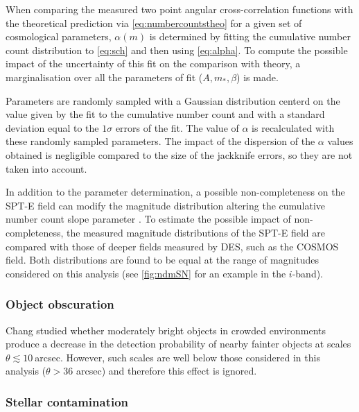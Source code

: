 	When comparing the measured two point angular cross-correlation functions with the theoretical prediction via \autoref{eq:numbercountstheo} for a given set of cosmological parameters, $\alpha(m)$ is determined by fitting the cumulative number count distribution to \autoref{eq:sch} and then using \autoref{eq:alpha}. To compute the possible impact of the uncertainty of this fit on the comparison with theory, a marginalisation over all the parameters of fit ($A,m_*,\beta$) is made.
\newline
	
Parameters are randomly sampled with a Gaussian distribution centerd on the value given by the fit to the cumulative number count and with a standard deviation equal to the $1\sigma$ errors of the fit. The value of $\alpha$ is recalculated with these randomly sampled parameters. The impact of the dispersion of the $\alpha$ values obtained is negligible compared to the size of the jackknife errors, so they are not taken into account.
\newline

In addition to the parameter determination, a possible non-completeness on the SPT-E field can modify the magnitude distribution altering the cumulative number count slope parameter \cite{2016MNRAS.455.3943H}. To estimate the possible impact of non-completeness, the measured magnitude distributions of the SPT-E field are compared with those of deeper fields measured by DES, such as the COSMOS field. Both distributions are found to be equal at the range of magnitudes considered on this analysis (see \autoref{fig:ndmSN} for an example in the $i$-band).

\subsubsection{Object obscuration}

Chang \cite{0004-637X-801-2-73} studied whether moderately bright objects in crowded environments produce a decrease in the detection probability of nearby fainter objects at scales $\theta\lesssim10\ $arcsec. However, such scales are well below those considered in this analysis ($\theta>36$ arcsec) and therefore this effect is ignored.

\subsubsection{Stellar contamination}
    

